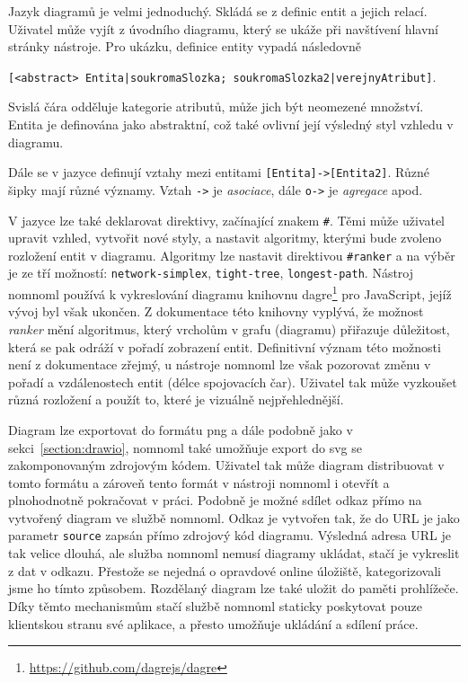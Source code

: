 Jazyk diagramů je velmi jednoduchý.
Skládá se z definic entit a jejich relací.
Uživatel může vyjít z úvodního diagramu, který se ukáže při navštívení hlavní stránky nástroje.
Pro ukázku, definice entity vypadá následovně

\noindent\texttt{[<abstract> Entita|soukromaSlozka; soukromaSlozka2|verejnyAtribut]}.

Svislá čára odděluje kategorie atributů, může jich být neomezené množství.
Entita je definována jako abstraktní, což také ovlivní její výsledný styl vzhledu v diagramu.

Dále se v jazyce definují vztahy mezi entitami \texttt{[Entita]->[Entita2]}.
Různé šipky mají různé významy.
Vztah \texttt{->} je \emph{asociace}, dále \texttt{o->} je \emph{agregace} apod.

V jazyce lze také deklarovat direktivy, začínající znakem \texttt{\#}.
Těmi může uživatel upravit vzhled, vytvořit nové styly, a nastavit algoritmy, kterými bude zvoleno rozložení entit v diagramu.
Algoritmy lze nastavit direktivou \texttt{\#ranker} a na výběr je ze tří možností: \texttt{network-simplex}, \texttt{tight-tree}, \texttt{longest-path}.
Nástroj nomnoml používá k vykreslování diagramu knihovnu dagre\footnote{\url{https://github.com/dagrejs/dagre}} pro JavaScript, jejíž vývoj byl však ukončen.
Z dokumentace této knihovny vyplývá, že možnost \emph{ranker} mění algoritmus, který vrcholům v grafu (diagramu) přiřazuje důležitost, která se pak odráží v pořadí zobrazení entit.
Definitivní význam této možnosti není z dokumentace zřejmý, u nástroje nomnoml lze však pozorovat změnu v pořadí a vzdálenostech entit (délce spojovacích čar).
Uživatel tak může vyzkoušet různá rozložení a použít to, které je vizuálně nejpřehlednější.

Diagram lze exportovat do formátu \acrshort{png} a dále podobně jako v sekci~\ref{section:drawio}, nomnoml také umožňuje export do \acrshort{svg} se zakomponovaným zdrojovým kódem.
Uživatel tak může diagram distribuovat v tomto formátu a zároveň tento formát v nástroji nomnoml i otevřít a plnohodnotně pokračovat v práci.
Podobně je možné sdílet odkaz přímo na vytvořený diagram ve službě nomnoml.
Odkaz je vytvořen tak, že do URL je jako parametr \texttt{source} zapsán přímo zdrojový kód diagramu.
Výsledná adresa URL je tak velice dlouhá, ale služba nomnoml nemusí diagramy ukládat, stačí je vykreslit z dat v odkazu.
Přestože se nejedná o opravdové online úložiště, kategorizovali jsme ho tímto způsobem.
Rozdělaný diagram lze také uložit do paměti prohlížeče.
Díky těmto mechanismům stačí službě nomnoml staticky poskytovat pouze klientskou stranu své aplikace, a přesto umožňuje ukládání a sdílení práce.

